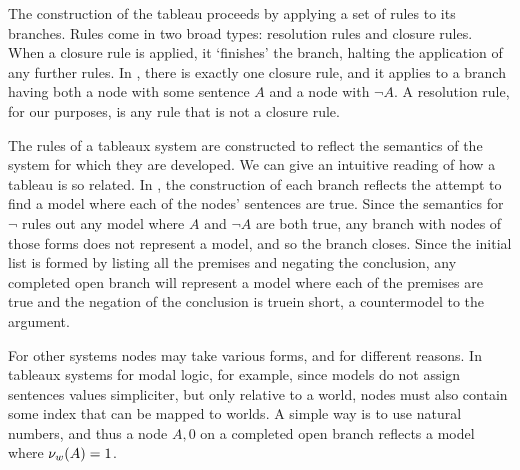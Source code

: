 \noindent The construction of the tableau proceeds by applying a set of rules to its branches. Rules come in two broad types: resolution rules and closure rules. When a closure rule is applied, it `finishes' the branch, halting the application of any further rules. In \CPL, there is exactly one closure rule, and it applies to a branch having both a node with some sentence $A$ and a node with $\neg A$. A resolution rule, for our purposes, is any rule that is not a closure rule.

The rules of a tableaux system are constructed to reflect the semantics of the system for which they are developed. We can give an intuitive reading of how a tableau is so related. In \CPL, the construction of each branch reflects the attempt to find a model where each of the nodes' sentences are true. Since the semantics for $\neg$ rules out any model where $A$ and $\neg A$ are both true, any branch with nodes of those forms does not represent a model, and so the branch closes. Since the initial list is formed by listing all the premises and negating the conclusion, any completed open branch will represent a model where each of the premises are true and the negation of the conclusion is true\textemdash in short, a countermodel to the argument.

For other systems nodes may take various forms, and for different reasons. In tableaux systems for modal logic, for example, since models do not assign sentences values simpliciter, but only relative to a world, nodes must also contain some index that can be mapped to worlds. A simple way is to use natural numbers, and thus a node $A,0$ on a completed open branch reflects a model where $\mathcal{\nu}_{w}({A})=1$.

